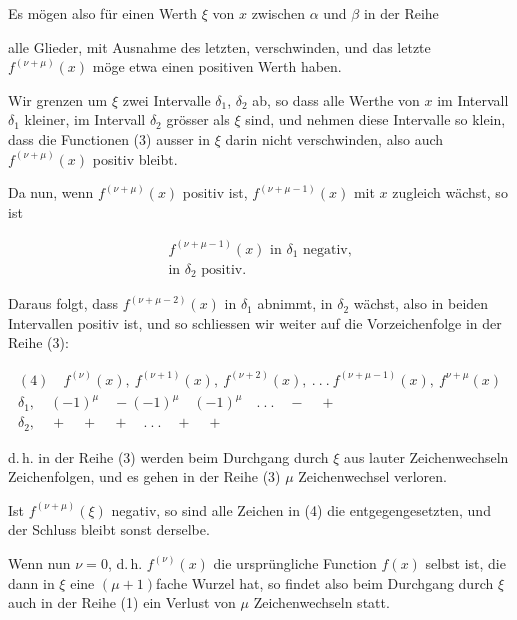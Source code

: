 
Es mögen also für einen Werth $\xi$ von $x$ zwischen $\alpha$ und $\beta$ in der Reihe


alle Glieder, mit Ausnahme des letzten, verschwinden, und das letzte $f^{(\nu+\mu)}(x)$ möge etwa einen positiven Werth haben.

Wir grenzen um $\xi$ zwei Intervalle $\delta_1$, $\delta_2$ ab, so dass alle Werthe von $x$ im Intervall $\delta_1$ kleiner, im Intervall $\delta_2$ grösser als $\xi$ sind, und nehmen diese Intervalle so klein, dass die Functionen (3) ausser in $\xi$ darin nicht verschwinden, also auch $f^{(\nu+\mu)}(x)$ positiv bleibt.

Da nun, wenn $f^{(\nu+\mu)}(x)$ positiv ist, $f^{(\nu+\mu-1)}(x)$ mit $x$ zugleich wächst, so ist

\[
\begin{array}{l}
f^{(\nu+\mu-1)}(x) \text{ in } \delta_1 \text{ negativ,} \\
\text{in } \delta_2 \text{ positiv.}
\end{array}
\]

Daraus folgt, dass $f^{(\nu+\mu-2)}(x)$ in $\delta_1$ abnimmt, in $\delta_2$ wächst, also in beiden Intervallen positiv ist, und so schliessen wir weiter auf die Vorzeichenfolge in der Reihe (3):

\[
\begin{array}{l}
(4)\quad f^{(\nu)}(x),\ f^{(\nu+1)}(x),\ f^{(\nu+2)}(x),\ .\ .\ .\ f^{(\nu+\mu-1)}(x),\ f^{\nu+\mu}(x) \\[4pt]
\delta_1,\quad (-1)^\mu \quad -(-1)^\mu \quad (-1)^\mu \quad .\ .\ . \quad - \quad + \\[2pt]
\delta_2,\quad + \quad + \quad + \quad .\ .\ . \quad + \quad +
\end{array}
\] %

d.\,h. in der Reihe (3) werden beim Durchgang durch $\xi$ aus lauter Zeichenwechseln Zeichenfolgen, und es gehen in der Reihe (3) $\mu$ Zeichenwechsel verloren.

Ist $f^{(\nu+\mu)}(\xi)$ negativ, so sind alle Zeichen in (4) die entgegengesetzten, und der Schluss bleibt sonst derselbe.

Wenn nun $\nu = 0$, d.\,h. $f^{(\nu)}(x)$ die ursprüngliche Function $f(x)$ selbst ist, die dann in $\xi$ eine $(\mu+1)$fache Wurzel hat, so findet also beim Durchgang durch $\xi$ auch in der Reihe (1) ein Verlust von $\mu$ Zeichenwechseln statt.

